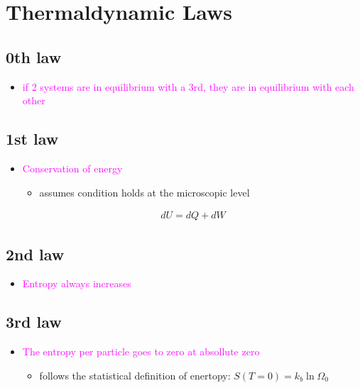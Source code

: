 

\section{Thermaldynamic Laws}

\subsection{0th law}
\begin{itemize}
    \item \textcolor{magenta}{if 2 systems are in equilibrium with a 3rd, they are in equilibrium
    with each other}
\end{itemize}


\subsection{1st law}
\begin{itemize}
    \item \textcolor{magenta}{Conservation of energy}
    \begin{itemize}
        \item assumes condition holds at the microscopic level
    \end{itemize}
    \begin{align}
        dU = dQ + dW
    \end{align}
\end{itemize}


\subsection{2nd law}
\begin{itemize}
    \item \textcolor{magenta}{Entropy always increases}
\end{itemize}


\subsection{3rd law}
\begin{itemize}
    \item \textcolor{magenta}{The entropy per particle goes to zero at absollute zero}
    \begin{itemize}
        \item follows the statistical definition of enertopy: $S(T = 0) = k_b \ln \Omega_0$
    \end{itemize}
\end{itemize}
